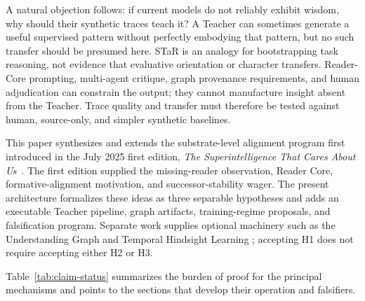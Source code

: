 \documentclass[11pt]{article}
\begin{document}
A natural objection follows: if current models do not reliably exhibit wisdom,
why should their synthetic traces teach it? A Teacher can sometimes generate a
useful supervised pattern without perfectly embodying that pattern, but no such
transfer should be presumed here. STaR \cite{zelikman2022star} is an analogy for
bootstrapping task reasoning, not evidence that evaluative orientation or
character transfers. Reader-Core prompting, multi-agent critique, graph
provenance requirements, and human adjudication can constrain the output; they
cannot manufacture insight absent from the Teacher. Trace quality and transfer
must therefore be tested against human, source-only, and simpler synthetic
baselines.

This paper synthesizes and extends the substrate-level alignment program first
introduced in the July 2025 first edition, \emph{The Superintelligence That
Cares About Us}~\cite{westerberg2025superintelligence}.
The first edition supplied the missing-reader observation, Reader Core, formative-alignment motivation, and successor-stability wager. The present architecture formalizes these ideas as three separable hypotheses and adds an executable Teacher pipeline, graph artifacts, training-regime proposals, and falsification program. Separate work supplies optional machinery such as the Understanding Graph and Temporal Hindsight Learning \cite{westerberg2026understanding,westerberg2026thl}; accepting H1 does not require accepting either H2 or H3.

Table~\ref{tab:claim-status} summarizes the burden of proof for the principal
mechanisms and points to the sections that develop their operation and
falsifiers.
\end{document}
